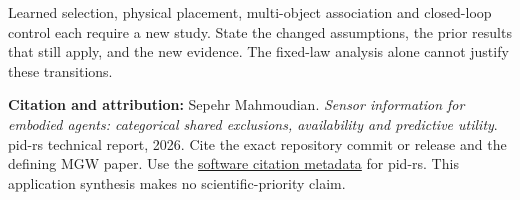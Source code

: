 \documentclass[11pt,a4paper]{article}
\begin{document}
Learned selection, physical placement, multi-object association and closed-loop control each require a new study. State the changed assumptions, the prior results that still apply, and the new evidence. The fixed-law analysis alone cannot justify these transitions.

\textbf{Citation and attribution:} Sepehr Mahmoudian. \emph{Sensor information for embodied agents: categorical shared exclusions, availability and predictive utility}. pid-rs technical report, 2026. Cite the exact repository commit or release and the defining MGW paper. Use the \href{https://github.com/sepahead/pid-rs/blob/main/CITATION.cff}{software citation metadata} for pid-rs. This application synthesis makes no scientific-priority claim.
\end{document}
